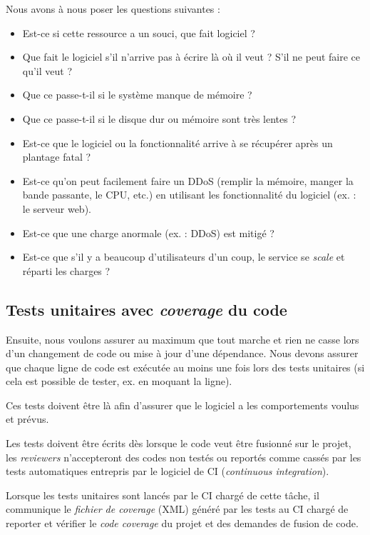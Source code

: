 \documentclass[final]{article}
\begin{document}
      Nous avons à nous poser les questions suivantes :
      \begin{itemize}
        \item Est-ce si cette ressource a un souci, que fait logiciel ?
        \item Que fait le logiciel s'il n'arrive pas à écrire là où il veut ?
              S'il ne peut faire ce qu'il veut ?
        \item Que ce passe-t-il si le système manque de mémoire ?
        \item Que ce passe-t-il si le disque dur ou mémoire sont très lentes ?
        \item Est-ce que le logiciel ou la fonctionnalité arrive à 
              se récupérer après un plantage fatal ?
        \item Est-ce qu'on peut facilement faire un DDoS 
              (remplir la mémoire, manger la bande passante, le CPU, etc.)
              en utilisant les fonctionnalité du logiciel (ex. : le serveur web).
        \item Est-ce que une charge anormale (ex. : DDoS) est mitigé ?
        \item Est-ce que s'il y a beaucoup d'utilisateurs d'un coup, 
              le service se \emph{scale} et réparti les charges ?
      \end{itemize}
      
    \subsection{Tests unitaires avec \emph{coverage} du code}
      Ensuite, nous voulons assurer au maximum que tout marche 
      et rien ne casse lors d'un changement de code ou mise à jour d'une dépendance.
      Nous devons assurer que chaque ligne de code est exécutée au moins une fois 
      lors des tests unitaires (si cela est possible de tester, ex. en moquant la ligne).
      
      Ces tests doivent être là afin d'assurer que le logiciel a les comportements voulus
      et prévus.
      
      Les tests doivent être écrits dès lorsque le code veut être fusionné sur le projet,
      les \emph{reviewers} n'accepteront des codes non testés ou reportés comme cassés 
      par les tests automatiques entrepris par le logiciel de CI 
      (\emph{continuous integration}).
      
      Lorsque les tests unitaires sont lancés par le CI chargé de cette tâche,
      il communique le \emph{fichier de coverage} (XML) généré par les tests 
      au CI chargé de reporter et vérifier le \emph{code coverage} du projet 
      et des demandes de fusion de code.
    
\end{document}
